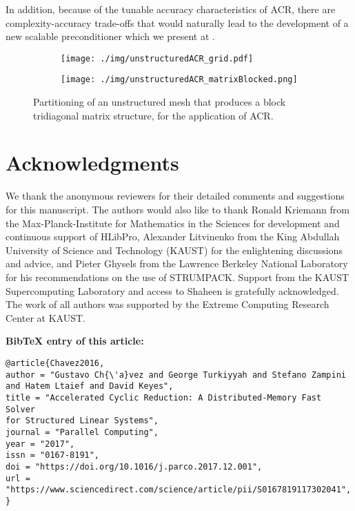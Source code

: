 \documentclass[]{elsarticle}
\begin{document}
In addition, because of the tunable accuracy characteristics of ACR, there are complexity-accuracy trade-offs that would naturally lead to the development of a new scalable preconditioner which we present at \cite{Chavez2017}.

\begin{figure}[H]
	\centering
	\begin{subfigure}{0.4\textwidth}
		\centering
		\texttt{[image: ./img/unstructuredACR\_grid.pdf]}
	\end{subfigure}
	\begin{subfigure}{0.4\textwidth}
		\centering
		\texttt{[image: ./img/unstructuredACR\_matrixBlocked.png]}
	\end{subfigure}
\caption{Partitioning of an unstructured mesh that produces a block tridiagonal matrix structure, for the application of ACR.}
\label{fig:unsACR}
\end{figure}

\section{Acknowledgments}
We thank the anonymous reviewers for their detailed comments and suggestions for this manuscript. The authors would also like to thank Ronald Kriemann from the Max-Planck-Institute for Mathematics in the Sciences for development and continuous support of HLibPro, Alexander Litvinenko from the King Abdullah University of Science and Technology (KAUST) for the enlightening discussions and advice, and Pieter Ghysels from the Lawrence Berkeley National Laboratory for his recommendations on the use of STRUMPACK. Support from the KAUST Supercomputing Laboratory and access to Shaheen is gratefully acknowledged. The work of all authors was supported by the Extreme Computing Research Center at KAUST.




\vspace{1in}
\textbf{BibTeX entry of this article:}
\begin{verbatim}
@article{Chavez2016,
author = "Gustavo Ch{\'a}vez and George Turkiyyah and Stefano Zampini
and Hatem Ltaief and David Keyes",
title = "Accelerated Cyclic Reduction: A Distributed-Memory Fast Solver
for Structured Linear Systems",
journal = "Parallel Computing",
year = "2017",
issn = "0167-8191",
doi = "https://doi.org/10.1016/j.parco.2017.12.001",
url = "https://www.sciencedirect.com/science/article/pii/S0167819117302041",
}
\end{verbatim}
\end{document}
